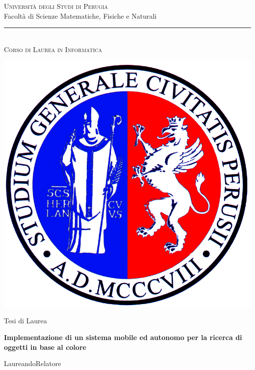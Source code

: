 \documentclass[a4paper,12pt]{report}
\title{\begin{large}\textbf{\titolotesi}\end{large}}
\author{\laureando}
\def\titolotesi{Implementazione di un sistema mobile ed autonomo per la ricerca di oggetti in base al colore} %
\begin{document}
\begin{titlepage}
\begin{center}
\textsc{\Large Universit\`a degli Studi di Perugia}\medskip\\

{\Large Facolt\`a di Scienze Matematiche, Fisiche e Naturali}\medskip\\

\rule{10mm}{0.01mm}\medskip\\

{\small \textsc{Corso di Laurea in Informatica}}\medskip\\

\vspace*{5mm}

\includegraphics[scale=0.2]{immagini/logouni.png}

\Large Tesi di Laurea \par\bigskip

{\large \bf \titolotesi \par}

\bigskip\bigskip

\end{center}\par

\hspace{0.5cm}Laureando\hspace{7.3cm}Relatore\par


\end{titlepage}
\end{document}
